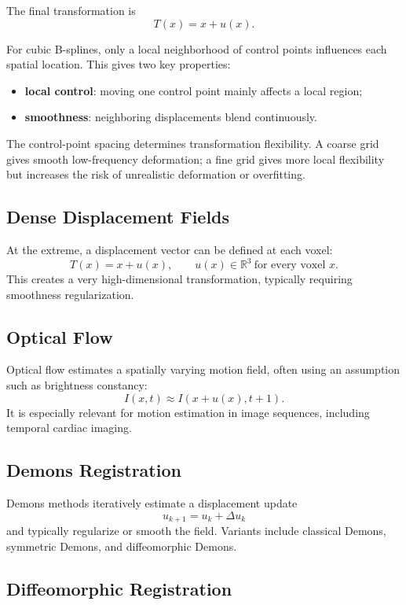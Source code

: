 \documentclass[11pt,a4paper]{article}
\newcommand{\R}{\mathbb{R}}
\begin{document}
The final transformation is
\[
T(x)=x+u(x).
\]

For cubic B-splines, only a local neighborhood of control points influences each spatial location. This gives two key properties:
\begin{itemize}
  \item \textbf{local control}: moving one control point mainly affects a local region;
  \item \textbf{smoothness}: neighboring displacements blend continuously.
\end{itemize}

The control-point spacing determines transformation flexibility. A coarse grid gives smooth low-frequency deformation; a fine grid gives more local flexibility but increases the risk of unrealistic deformation or overfitting.

\subsection{Dense Displacement Fields}

At the extreme, a displacement vector can be defined at each voxel:
\[
T(x)=x+u(x),
\qquad
u(x)\in\R^3\ \text{for every voxel }x.
\]
This creates a very high-dimensional transformation, typically requiring smoothness regularization.

\subsection{Optical Flow}

Optical flow estimates a spatially varying motion field, often using an assumption such as brightness constancy:
\[
I(x,t)\approx I(x+u(x),t+1).
\]
It is especially relevant for motion estimation in image sequences, including temporal cardiac imaging.

\subsection{Demons Registration}

Demons methods iteratively estimate a displacement update
\[
 u_{k+1}=u_k+\Delta u_k
\]
and typically regularize or smooth the field. Variants include classical Demons, symmetric Demons, and diffeomorphic Demons.

\subsection{Diffeomorphic Registration}
\end{document}
